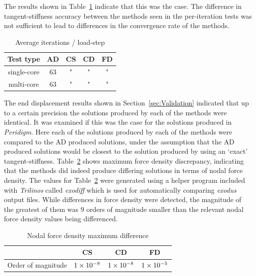 \documentclass[preprint,12pt]{elsarticle}
\begin{document}
The results shown in Table~\ref{tab:ConvergenceStudy2} indicate that this was the case.  The difference in tangent-stiffness accuracy between the methods seen in the per-iteration tests was not sufficient to lead to differences in the convergence rate of the methods.
%
\begin{table}[htb]   
    \centering 
    \caption{Average iterations / load-step} 
    \label{tab:ConvergenceStudy2}   
    \begin{tabular}{c c c c c}
        \toprule 
        Test type & AD & CS & CD & FD\\
        \midrule 
        single-core & 63 & " & " & "\\ 
        multi-core  & 63 & " & " & "\\ 
        \bottomrule 
    \end{tabular} 
\end{table}

The end displacement results shown in Section~\ref{sec:Validation} indicated that up to a certain precision the solutions produced by each of the methods were identical. It was examined if this was the case for the solutions produced in \emph{Peridigm}. Here each of the solutions produced by each of the methods were compared to the AD produced solutions, under the assumption that the AD produced solutions would be closest to the solution produced by using an `exact' tangent-stiffness. Table~\ref{tab:PeridigmSolutionAccuracy} shows maximum force density discrepancy, indicating that the methods did indeed produce differing solutions in terms of nodal force density. The values for Table~\ref{tab:PeridigmSolutionAccuracy} were generated using a helper program included with \emph{Trilinos} called \emph{exodiff} which is used for automatically comparing \emph{exodus} output files. While differences in force density were detected, the magnitude of the greatest of them was $9$ orders of magnitude smaller than the relevant nodal force density values being differenced. 
%
\begin{table}[hbp]   
    \centering 
    \caption{Nodal force density maximum difference} 
    \label{tab:PeridigmSolutionAccuracy}   
    \begin{tabular}{c c c c}
        \toprule  & CS & CD & FD\\
        \midrule  Order of magnitude & $\num{1.E-8}$ & $\num{1.E-8}$ & $\num{1.E-5}$ \\ 
        \bottomrule 
    \end{tabular} 
\end{table}
\end{document}
